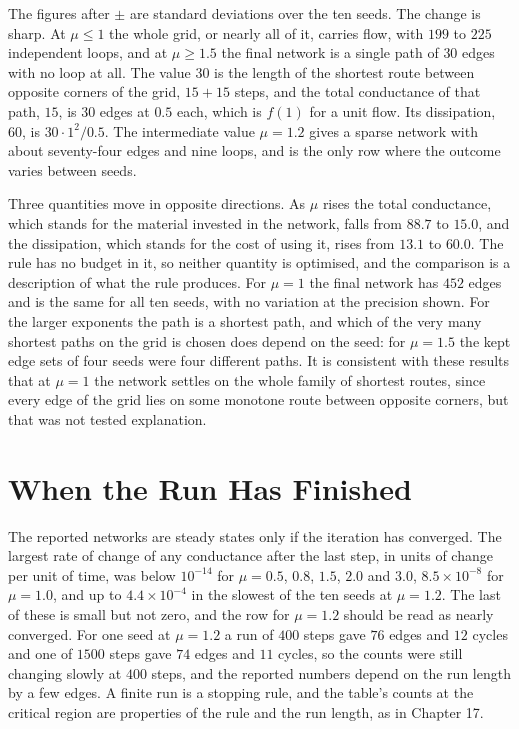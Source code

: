 The figures after $\pm$ are standard deviations over the ten seeds. The change is sharp. At $\mu\le1$ the whole grid, or nearly all of it, carries flow, with $199$ to $225$ independent loops, and at $\mu\ge1.5$ the final network is a single path of $30$ edges with no loop at all. The value $30$ is the length of the shortest route between opposite corners of the grid, $15+15$ steps, and the total conductance of that path, $15$, is $30$ edges at $0.5$ each, which is $f(1)$ for a unit flow. Its dissipation, $60$, is $30\cdot1^2/0.5$. The intermediate value $\mu=1.2$ gives a sparse network with about seventy-four edges and nine loops, and is the only row where the outcome varies between seeds.

Three quantities move in opposite directions. As $\mu$ rises the total conductance, which stands for the material invested in the network, falls from $88.7$ to $15.0$, and the dissipation, which stands for the cost of using it, rises from $13.1$ to $60.0$. The rule has no budget in it, so neither quantity is optimised, and the comparison is a description of what the rule produces. For $\mu=1$ the final network has $452$ edges and is the same for all ten seeds, with no variation at the precision shown. For the larger exponents the path is a shortest path, and which of the very many shortest paths on the grid is chosen does depend on the seed: for $\mu=1.5$ the kept edge sets of four seeds were four different paths. It is consistent with these results that at $\mu=1$ the network settles on the whole family of shortest routes, since every edge of the grid lies on some monotone route between opposite corners, but that was not tested explanation.

\section{When the Run Has Finished}

The reported networks are steady states only if the iteration has converged. The largest rate of change of any conductance after the last step, in units of change per unit of time, was below $10^{-14}$ for $\mu=0.5$, $0.8$, $1.5$, $2.0$ and $3.0$, $8.5\times10^{-8}$ for $\mu=1.0$, and up to $4.4\times10^{-4}$ in the slowest of the ten seeds at $\mu=1.2$. The last of these is small but not zero, and the row for $\mu=1.2$ should be read as nearly converged. For one seed at $\mu=1.2$ a run of $400$ steps gave $76$ edges and $12$ cycles and one of $1500$ steps gave $74$ edges and $11$ cycles, so the counts were still changing slowly at $400$ steps, and the reported numbers depend on the run length by a few edges. A finite run is a stopping rule, and the table's counts at the critical region are properties of the rule and the run length, as in Chapter 17.

